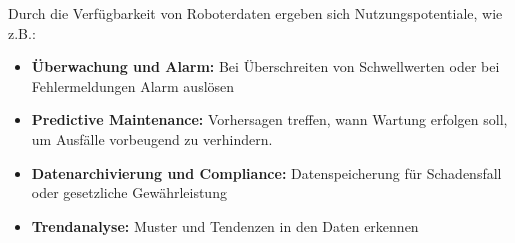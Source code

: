 \documentclass[ a4paper,
                oneside,
                toc=bibliography,
                toc=listof
                ]{scrbook}
\begin{document}
\begin{longtable}{|p{7cm}|p{3cm}|p{3cm}|}
	\end{longtable}
	Durch die Verfügbarkeit von Roboterdaten ergeben sich Nutzungspotentiale, wie z.B.:
	\begin{itemize}
		\item \textbf{Überwachung und Alarm:} Bei Überschreiten von Schwellwerten oder bei Fehlermeldungen Alarm auslösen
		\item \textbf{Predictive Maintenance:} Vorhersagen treffen, wann Wartung erfolgen soll, um Ausfälle vorbeugend zu verhindern.
		\item \textbf{Datenarchivierung und Compliance:} Datenspeicherung für Schadensfall oder gesetzliche Gewährleistung
		\item \textbf{Trendanalyse:} Muster und Tendenzen in den Daten erkennen
	\end{itemize}
	
\end{document}
